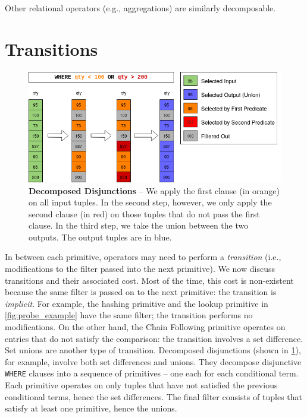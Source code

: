 \documentclass[12pt]{cmuthesis}
\begin{document}
Other relational operators (e.g., aggregations) are similarly decomposable.

\section{Transitions}
\begin{figure}[t!]
    \centering
    \includegraphics[scale=0.5]{images/DisjunctionHowto.png}
    \caption{\textbf{Decomposed Disjunctions} -- We apply the first clause (in orange) on all input tuples. In the second step, however, we only apply the second clause (in red) on those tuples that do not pass the first clause. In the third step, we take the union between the two outputs. The output tuples are in blue.}
    \label{fig:disjunctive_filter_howto}
\end{figure}

In between each primitive, operators may need to perform a \textit{transition} (i.e., modifications to the filter passed into the next primitive). We now discuss transitions and their associated cost. Most of the time, this cost is non-existent because the same filter is passed on to the next primitive: the transition is \textit{implicit}. For example, the hashing primitive and the lookup primitive in \cref{fig:probe_example} have the same filter; the transition performs no modifications. On the other hand, the Chain Following primitive operates on entries that do not satisfy the comparison: the transition involves a set difference. Set unions are another type of transition. Decomposed disjunctions \cite{pcq} (shown in \cref{fig:disjunctive_filter_howto}), for example, involve both set differences and unions. They decompose disjunctive \texttt{WHERE} clauses into a sequence of primitives -- one each for each conditional term. Each primitive operates on only tuples that have not satisfied the previous conditional terms, hence the set differences. The final filter consists of tuples that satisfy at least one primitive, hence the unions.
\end{document}
